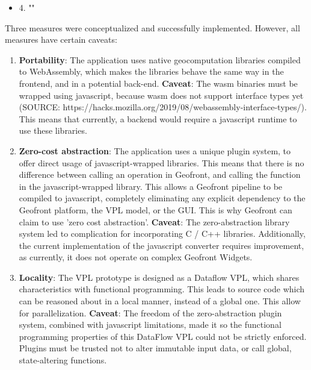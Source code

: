\begin{itemize}[ ]
  \item 4. "\myNewSubRQFour"
\end{itemize}

Three measures were conceptualized and successfully implemented. However, all measures have certain caveats:

\begin{enumerate}
  \item \textbf{Portability}: The application uses native geocomputation libraries compiled to WebAssembly, which makes the libraries behave the same way in the frontend, and in a potential back-end.
  \subitem \textbf{Caveat}: The \ac{wasm} binaries must be wrapped using javascript, because \ac{wasm} does not support interface types yet (SOURCE: https://hacks.mozilla.org/2019/08/webassembly-interface-types/). This means that currently, a backend would require a javascript runtime to use these libraries.

  \item \textbf{Zero-cost abstraction}: The application uses a unique plugin system, to offer direct usage of javascript-wrapped libraries.
  This means that there is no difference between calling an operation in Geofront, and calling the function in the javascript-wrapped library.
  This allows a Geofront pipeline to be compiled to javascript, completely eliminating any explicit dependency to the 
  Geofront platform, the VPL model, or the \ac{GUI}.
  This is why Geofront can claim to use 'zero cost abstraction'.
  \subitem \textbf{Caveat}: The zero-abstraction library system led to complication for incorporating C / C++ libraries.
  Additionally, the current implementation of the javascript converter requires improvement, as currently, it does not operate on complex Geofront Widgets. 
 
  \item \textbf{Locality}: The VPL prototype is designed as a Dataflow VPL, which shares characteristics with functional programming. This leads to source code which can be reasoned about in a local manner, instead of a global one. This allow for parallelization.
  \subitem \textbf{Caveat}: The freedom of the zero-abstraction plugin system, combined with javascript limitations, made it so the functional programming properties of this DataFlow VPL could not be strictly enforced. 
  Plugins must be trusted not to alter immutable input data, or call global, state-altering functions.
    
\end{enumerate}

